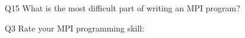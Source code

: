 \begin{description}%
\item{Q15} What is the most difficult part of writing an MPI program?%
\item{Q3} Rate your MPI programming skill:%
\end{description}%
